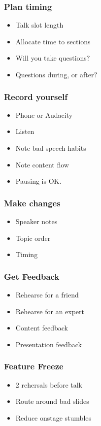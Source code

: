 \documentclass{beamer}
\begin{document}
\begin{frame}[fragile]
\tableofcontents[currentsection]
\end{frame}


\begin{frame}[fragile]
\frametitle{Plan timing}
\begin{itemize}[<+(1)->]
\item Talk slot length
\item Allocate time to sections
\item Will you take questions$?$
\item Questions during, or after$?$
\end{itemize}
\end{frame}

\begin{frame}[fragile]
\frametitle{Record yourself}
\begin{itemize}[<+(1)->]
\item Phone or Audacity
\item Listen
\item Note bad speech habits
\item Note content flow
\item Pausing is OK.
\end{itemize}
\end{frame}

\begin{frame}[fragile]
\frametitle{Make changes}
\begin{itemize}[<+(1)->]
\item Speaker notes
\item Topic order
\item Timing
\end{itemize}
\end{frame}

\begin{frame}[fragile]
\frametitle{Get Feedback}
\begin{itemize}[<+(1)->]
\item Rehearse for a friend
\item Rehearse for an expert
\item Content feedback
\item Presentation feedback
\end{itemize}
\end{frame}

\begin{frame}[fragile]
\frametitle{Feature Freeze}
\begin{itemize}[<+(1)->]
\item 2 rehersals before talk
\item Route around bad slides
\item Reduce onstage stumbles
\end{itemize}
\end{frame}
\end{document}
